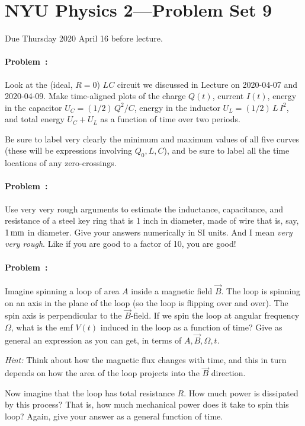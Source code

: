 \documentclass[12pt]{article}
\begin{document}
\section*{NYU Physics 2---Problem Set 9}

Due Thursday 2020 April 16 before lecture.

\paragraph{Problem~\theproblem:}%
Look at the (ideal, $R=0$) $LC$ circuit we discussed in Lecture on
2020-04-07 and 2020-04-09. Make time-aligned plots of the charge
$Q(t)$, current $I(t)$, energy in the capacitor $U_C=(1/2)\,Q^2/C$,
energy in the inductor $U_L=(1/2)\,L\,I^2$, and total energy $U_C+U_L$
as a function of time over two periods.

Be sure to label very clearly the minimum and maximum values of all
five curves (these will be expressions involving $Q_0, L, C$), and be
sure to label all the time locations of any zero-crossings.

\paragraph{Problem~\theproblem:}%
Use very very rough arguments to estimate the inductance, capacitance,
and resistance of a steel key ring that is 1 inch in diameter, made of
wire that is, say, $1\,\mathrm{mm}$ in diameter. Give your answers numerically
in SI units.
And I mean \emph{very very rough}. Like if you are good to a factor of
10, you are good!

\paragraph{Problem~\theproblem:}%
Imagine spinning a loop of area $A$ inside a magnetic field $\vec{B}$.
The loop is spinning on an axis in the plane of the loop (so the loop
is flipping over and over).  The spin axis is perpendicular to the
$\vec{B}$-field.  If we spin the loop at angular frequency $\Omega$,
what is the emf $V(t)$ induced in the loop as a function of time? Give as
general an expression as you can get, in terms of $A, \vec{B}, \Omega, t$.

\textsl{Hint:} Think about how the magnetic flux changes with time,
and this in turn depends on how the area of the loop projects into the
$\vec{B}$ direction.

Now imagine that the loop has total resistance $R$. How much power is
dissipated by this process? That is, how much mechanical power does it
take to spin this loop? Again, give your answer as a general function of time.
\end{document}

